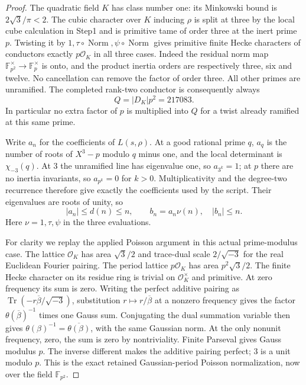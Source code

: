 \begin{proof}
The quadratic field $K$ has class number one: its Minkowski bound
is $2\sqrt3/\pi<2$.  The cubic character over $K$ inducing $\rho$
is split at three by the local cube calculation in Step1 and is
primitive tame of order three at the inert prime $p$.
Twisting it by $1,\tau\circ\operatorname{Norm},
\psi\circ\operatorname{Norm}$ gives primitive finite Hecke
characters of conductors exactly $p\mathcal O_K$ in all three cases.
Indeed the residual norm map $\mathbb F_{p^2}^\times\to
\mathbb F_p^\times$ is onto, and the product inertia orders
are respectively three, six and twelve.  No cancellation can
remove the factor of order three.  All other primes are unramified.
The completed rank-two conductor is consequently always
\[
                           Q=|D_K|p^2=217083.
 \tag{PCQ.17}
\]
In particular no extra factor of $p$ is multiplied into $Q$ for
a twist already ramified at this same prime.

Write $a_n$ for the coefficients of $L(s,\rho)$.
At a good rational prime $q$, $a_q$ is the number of roots of
$X^3-p$ modulo $q$ minus one, and the local determinant is
$\chi_{-3}(q)$.  At $3$ the unramified line has eigenvalue one,
so $a_{3^k}=1$; at $p$ there are no inertia invariants, so
$a_{p^k}=0$ for $k>0$.  Multiplicativity and the degree-two
recurrence therefore give exactly the coefficients used by the
script.  Their eigenvalues are roots of unity, so
\[
                  |a_n|\leq d(n)\leq n,
       \qquad b_n=a_n\nu(n),\quad |b_n|\leq n.
 \tag{PCQ.18}
\]
Here $\nu=1,\tau,\psi$ in the three evaluations.

For clarity we replay the applied Poisson argument in this actual
prime-modulus case.  The lattice $\mathcal O_K$ has area
$\sqrt3/2$ and trace-dual scale $2/\sqrt{-3}$ for the real
Euclidean Fourier pairing.  The period lattice
$p\mathcal O_K$ has area $p^2\sqrt3/2$.
The finite Hecke character on its residue ring is trivial on
$\mathcal O_K^\times$ and primitive.  At zero frequency its sum
is zero.  Writing the perfect additive pairing as
$\operatorname{Tr}(-r\overline\beta/\sqrt{-3})$, substitution
$r\mapsto r/\overline\beta$ at a nonzero frequency gives the
factor $\theta(\overline\beta)^{-1}$ times one Gauss sum.
Conjugating the dual summation variable then gives
$\theta(\beta)^{-1}=\overline{\theta(\beta)}$, with the same
Gaussian norm.  At the only nonunit frequency, zero, the sum
is zero by nontriviality.
Finite Parseval gives Gauss modulus $p$.
The inverse different makes the additive pairing perfect; $3$ is
a unit modulo $p$.  This is the exact retained Gaussian-period
Poisson normalization, now over the field $\mathbb F_{p^2}$.


\end{proof}
